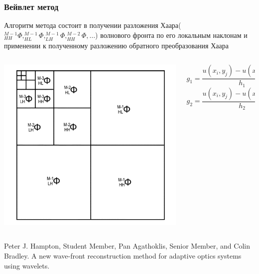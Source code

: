 \documentclass[11pt]{beamer}
\begin{document}
\begin{frame}
\frametitle{Вейвлет метод}


\begin{block}{}
Алгоритм метода состоит в получении разложения Хаара($_{HH}^{M-1}\Phi, _{HL}^{M-1}\Phi, _{LH}^{M-1}\Phi, _{HH}^{M-2}\Phi, \ldots $) волнового фронта по его локальным наклонам и применении к полученному разложению обратного преобразования Хаара
\end{block}

\begin{columns}
\begin{column}{0.5\textwidth}
\includegraphics[width=\linewidth]{hwaf_decomp.png}
\end{column}

\begin{column}{0.5\textwidth}
$$g_1= \frac{u(x_i,y_j) - u(x_{i-1},y_j)}{h_1}$$
$$g_2= \frac{u(x_i,y_j) - u(x_i,y_{j-1})}{h_2}$$

\end{column}
\end{columns}
\tiny Peter J. Hampton, Student Member, Pan Agathoklis, Senior Member, and Colin Bradley. A new wave-front reconstruction method for adaptive optics systems using wavelets.
\end{frame}
\end{document}
